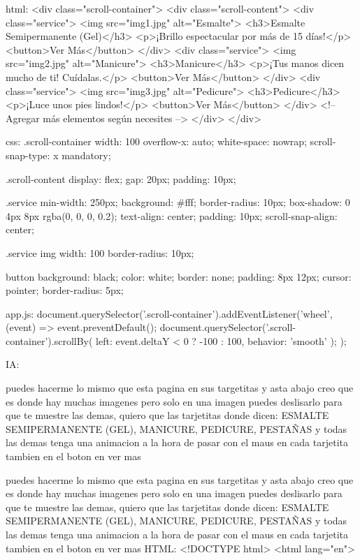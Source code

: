 html:     <div class="scroll-container">
    <div class="scroll-content">
        <div class="service">
            <img src="img1.jpg" alt="Esmalte">
            <h3>Esmalte Semipermanente (Gel)</h3>
            <p>¡Brillo espectacular por más de 15 días!</p>
            <button>Ver Más</button>
        </div>
        <div class="service">
            <img src="img2.jpg" alt="Manicure">
            <h3>Manicure</h3>
            <p>¡Tus manos dicen mucho de ti! Cuídalas.</p>
            <button>Ver Más</button>
        </div>
        <div class="service">
            <img src="img3.jpg" alt="Pedicure">
            <h3>Pedicure</h3>
            <p>¡Luce unos pies lindos!</p>
            <button>Ver Más</button>
        </div>
        <!-- Agregar más elementos según necesites -->
    </div>
</div>


css:
.scroll-container {
    width: 100%
    overflow-x: auto;
    white-space: nowrap;
    scroll-snap-type: x mandatory;
}

.scroll-content {
    display: flex;
    gap: 20px;
    padding: 10px;
}

.service {
    min-width: 250px;
    background: #fff;
    border-radius: 10px;
    box-shadow: 0 4px 8px rgba(0, 0, 0, 0.2);
    text-align: center;
    padding: 10px;
    scroll-snap-align: center;
}

.service img {
    width: 100%
    border-radius: 10px;
}

button {
    background: black;
    color: white;
    border: none;
    padding: 8px 12px;
    cursor: pointer;
    border-radius: 5px;
}

app.js: 
document.querySelector('.scroll-container').addEventListener('wheel', (event) => {
    event.preventDefault();
    document.querySelector('.scroll-container').scrollBy({
        left: event.deltaY < 0 ? -100 : 100,
        behavior: 'smooth'
    });
});





IA:

puedes hacerme lo mismo que esta pagina en sus targetitas y asta abajo creo que es donde hay muchas imagenes pero solo en una imagen puedes deslisarlo para que te muestre las demas, quiero que las tarjetitas donde dicen: ESMALTE SEMIPERMANENTE (GEL), MANICURE, PEDICURE, PESTAÑAS y todas las demas tenga una animacion a la hora de pasar con el maus en cada tarjetita tambien en el boton en ver mas 



puedes hacerme lo mismo que esta pagina en sus targetitas y asta abajo creo que es donde hay muchas imagenes pero solo en una imagen puedes deslisarlo para que te muestre las demas, quiero que las tarjetitas donde dicen: ESMALTE SEMIPERMANENTE (GEL), MANICURE, PEDICURE, PESTAÑAS y todas las demas tenga una animacion a la hora de pasar con el maus en cada tarjetita tambien en el boton en ver mas 
HTML:
<!DOCTYPE html>
<html lang="en">

